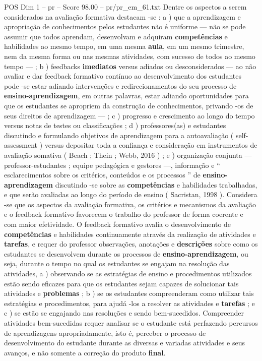 \begin{textsample}{POS Dim 1 – pr – Score 98.00 – pr/pr\_em\_61.txt}
Dentre os aspectos a serem considerados na avaliação formativa destacam -se : a ) que a aprendizagem e apropriação de conhecimentos pelos estudantes não é uniforme — não se pode assumir que todos aprendam, desenvolvam e adquiram \textbf{competências} e habilidades ao mesmo tempo, em uma mesma \textbf{aula}, em um mesmo trimestre, nem da mesma forma ou nas mesmas atividades, com sucesso de todos ao mesmo tempo — ; b ) feedbacks \textbf{imediatos} versus adiados ou desconsiderados — ao não avaliar e dar feedback formativo contínuo ao desenvolvimento dos estudantes pode -se estar adiando intervenções e redirecionamentos do seu processo de \textbf{ensino-aprendizagem}, em outras palavras, estar adiando oportunidades para que os estudantes se apropriem da construção de conhecimentos, privando -os de seus direitos de aprendizagem — ; c ) progresso e crescimento ao longo do tempo versus notas de testes ou classificações ; d ) professores(as) e estudantes discutindo e formulando objetivos de aprendizagem para a autoavaliação ( self-assessment ) versus depositar toda a confiança e consideração em instrumentos de avaliação somativa ( Beach ; Thein ; Webb, 2016 ) ; e ) organização conjunta — professor-estudantes ; equipe pedagógica e gestores —, informação e “ esclarecimentos sobre os critérios, conteúdos e os processos ” de \textbf{ensino-aprendizagem} discutindo -se sobre as \textbf{competências} e habilidades trabalhadas, e que serão avaliadas ao longo do período de ensino ( Sacristan, 1998 ).
Considera -se que os aspectos da avaliação formativa, os critérios e mecanismos da avaliação e o feedback formativo favorecem o trabalho do professor de forma coerente e com maior efetividade.
O feedback formativo avalia o desenvolvimento de \textbf{competências} e habilidades continuamente através da realização de atividades e \textbf{tarefas}, e requer do professor observações, anotações e \textbf{descrições} sobre como os estudantes se desenvolvem durante os processos de \textbf{ensino-aprendizagem}, ou seja, durante o tempo no qual os estudantes se engajam na resolução das atividades, a ) observando se as estratégias de ensino e procedimentos utilizados estão sendo eficazes para que os estudantes sejam capazes de solucionar tais atividades e \textbf{problemas} ; b ) se os estudantes compreenderam como utilizar tais estratégias e procedimentos, para ajudá -los a resolver as atividades e \textbf{tarefas} ; e c ) se estão se engajando nas resoluções e sendo bem-sucedidos.
Compreender atividades bem-sucedidas requer analisar se o estudante está perfazendo percursos de aprendizagens apropriadamente, isto é, perceber o processo de desenvolvimento do estudante durante as diversas e variadas atividades e seus avanços, e não somente a correção do produto \textbf{final}.

\end{textsample}
